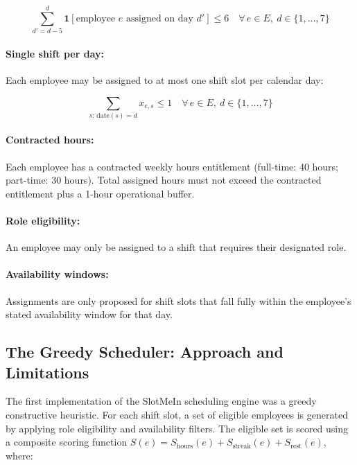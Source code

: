 \documentclass[12pt,a4paper,oneside]{article}
\begin{document}
\begin{equation}
\sum_{d'=d-5}^{d} \mathbf{1}[\text{employee } e \text{ assigned on day } d'] \leq 6 \quad \forall\, e \in E,\ d \in \{1, \ldots, 7\}
\label{eq:consecutive}
\end{equation}

\paragraph{Single shift per day:} Each employee may be assigned to at most one shift slot per calendar day:

\begin{equation}
\sum_{s:\, \text{date}(s) = d} x_{e,s} \leq 1 \quad \forall\, e \in E,\ d \in \{1, \ldots, 7\}
\label{eq:daily}
\end{equation}

\paragraph{Contracted hours:} Each employee has a contracted weekly hours entitlement (full-time: 40 hours; part-time: 30 hours). Total assigned hours must not exceed the contracted entitlement plus a 1-hour operational buffer.

\paragraph{Role eligibility:} An employee may only be assigned to a shift that requires their designated role.

\paragraph{Availability windows:} Assignments are only proposed for shift slots that fall fully within the employee's stated availability window for that day.

\subsection{The Greedy Scheduler: Approach and Limitations}

The first implementation of the SlotMeIn scheduling engine was a greedy constructive heuristic. For each shift slot, a set of eligible employees is generated by applying role eligibility and availability filters. The eligible set is scored using a composite scoring function $S(e) = S_{\text{hours}}(e) + S_{\text{streak}}(e) + S_{\text{rest}}(e)$, where:
\end{document}
